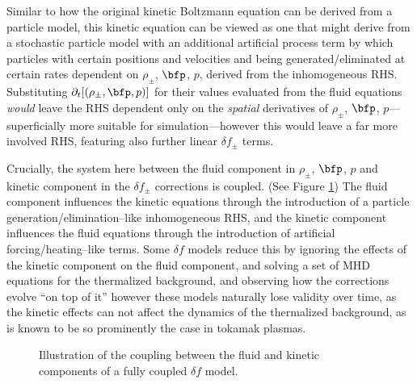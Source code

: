     Similar to how the original kinetic Boltzmann equation can be derived from a particle model, this kinetic equation can be viewed as one that might derive from a stochastic particle model with an additional artificial process term by which particles with certain positions and velocities and being generated/eliminated at certain rates dependent on $\rho_{\pm}$, $\bfp$, $p$, derived from the inhomogeneous RHS. Substituting $\partial_{t}[(\rho_{\pm}, \bfp, p)]$ for their values evaluated from the fluid equations \emph{would} leave the RHS dependent only on the \emph{spatial} derivatives of $\rho_{\pm}$, $\bfp$, $p$---superficially more suitable for simulation---however this would leave a far more involved RHS, featuring also further linear $\delta\!f_{\pm}$ terms.

    \line

    Crucially, the system here between the fluid component in $\rho_{\pm}$, $\bfp$, $p$ and kinetic component in the $\delta\!f_{\pm}$ corrections is coupled. (See Figure \ref{fig:delta f coupling}) The fluid component influences the kinetic equations through the introduction of a particle generation/elimination--like inhomogeneous RHS, and the kinetic component influences the fluid equations through the introduction of artificial forcing/heating--like terms. Some $\delta\!f$ models reduce this by ignoring the effects of the kinetic component on the fluid component, and solving a set of MHD equations for the thermalized background, and observing how the corrections evolve ``on top of it''  however these models naturally lose validity over time, as the kinetic effects can not affect the dynamics of the thermalized background, as is known to be so prominently the case in tokamak plasmas.

    \begin{figure}[!ht]
        \centering
        \caption{Illustration of the coupling between the fluid and kinetic components of a fully coupled $\delta\!f$ model.}
        \label{fig:delta f coupling}
    \end{figure}
    